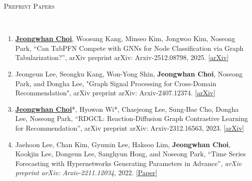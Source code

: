 \documentclass[10pt]{article}
\newenvironment{changemargin}[2]{
  \begin{list}{}{
    \setlength{\topsep}{0pt}
    \setlength{\leftmargin}{#1}
    \setlength{\rightmargin}{#2}
    \setlength{\listparindent}{\parindent}
    \setlength{\itemindent}{\parindent}
    \setlength{\parsep}{\parskip}
  }
  \item[]}{\end{list}
}
\newcommand{\lineover}{
	\begin{changemargin}{-0.05in}{-0.05in}
		\vspace*{-8pt}
		\hrulefill \\
		\vspace*{-2pt}
	\end{changemargin}
}
\newcommand{\textbu}[1]{\underline{\textbf{#1}}}
\newenvironment{body} {
	\vspace*{-16pt}
	\begin{changemargin}{-0.25in}{-0.5in}
  }
	{\end{changemargin}
}
\begin{document}
\begin{body}
\vspace{1em}
\textsc{Preprint Papers}
\lineover
\begin{enumerate}
    \item \textbu{Jeongwhan Choi}, Woosung Kang, Minseo Kim, Jongwoo Kim, Noseong Park, ``Can TabPFN Compete with GNNs for Node Classification via Graph Tabularization?'', arXiv preprint arXiv: Arxiv-2512.08798, 2025. [\href{https://arxiv.org/abs/2512.08798}{arXiv}]
    \item Jeongeun Lee, Seongku Kang, Won-Yong Shin, \textbf{Jeongwhan Choi}, Noseong Park, and Dongha Lee, "Graph Signal Processing for Cross-Domain Recommendation", arXiv preprint arXiv: Arxiv-2407.12374. [\href{https://arxiv.org/abs/2407.12374}{arXiv}]
    \item \textbu{Jeongwhan Choi}*, Hyowon Wi*, Chaejeong Lee, Sung-Bae Cho, Dongha Lee, Noseong Park, ``RDGCL: Reaction-Diffusion Graph Contrastive Learning for Recommendation'',  arXiv preprint arXiv: Arxiv-2312.16563, 2023. [\href{https://arxiv.org/abs/2312.16563}{arXiv}]
    \item Jaehoon Lee, Chan Kim, Gyumin Lee, Haksoo Lim, \textbf{Jeongwhan Choi}, Kookjin Lee, Dongeun Lee, Sanghyun Hong, and Noseong Park, ``Time Series Forecasting with Hypernetworks Generating Parameters in Advance'', \emph{arXiv preprint arXiv: Arxiv-2211.12034}, 2022. [\href{https://arxiv.org/abs/2211.12034}{Paper}]
\end{enumerate}
\end{body}

\medskip
\end{document}

